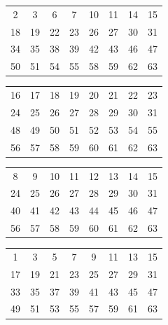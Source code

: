 \documentclass{beamer}
\begin{document}
\begin{frame}
  \begin{table}[h]
    \centering
    \begin{tabular}{|c c c c c c c c|}\hline
      2  & 3  & 6  & 7  & 10 & 11 & 14 & 15 \\
      18 & 19 & 22 & 23 & 26 & 27 & 30 & 31 \\
      34 & 35 & 38 & 39 & 42 & 43 & 46 & 47 \\
      50 & 51 & 54 & 55 & 58 & 59 & 62 & 63 \\ \hline
    \end{tabular}
  \end{table}
\end{frame}
%
\begin{frame}
  \begin{table}[h]
    \centering
    \begin{tabular}{|c c c c c c c c|}\hline
     16 & 17 & 18 & 19 & 20 & 21 & 22 & 23 \\
     24 & 25 & 26 & 27 & 28 & 29 & 30 & 31 \\
     48 & 49 & 50 & 51 & 52 & 53 & 54 & 55 \\
     56 & 57 & 58 & 59 & 60 & 61 & 62 & 63 \\ \hline
    \end{tabular}
  \end{table}
\end{frame}
%
\begin{frame}
  \begin{table}[h]
    \centering
    \begin{tabular}{|c c c c c c c c|}\hline
      8  & 9  & 10 & 11 & 12 & 13 & 14 & 15 \\
      24 & 25 & 26 & 27 & 28 & 29 & 30 & 31 \\
      40 & 41 & 42 & 43 & 44 & 45 & 46 & 47 \\
      56 & 57 & 58 & 59 & 60 & 61 & 62 & 63 \\ \hline
    \end{tabular}
  \end{table}
\end{frame}
%
\begin{frame}
  \begin{table}[h]
    \centering
    \begin{tabular}{|c c c c c c c c|}\hline
   1  & 3  & 5  & 7  & 9  & 11 & 13 & 15 \\
   17 & 19 & 21 & 23 & 25 & 27 & 29 & 31 \\
   33 & 35 & 37 & 39 & 41 & 43 & 45 & 47 \\
   49 & 51 & 53 & 55 & 57 & 59 & 61 & 63 \\ \hline
    \end{tabular}
  \end{table}
\end{frame}
\end{document}
